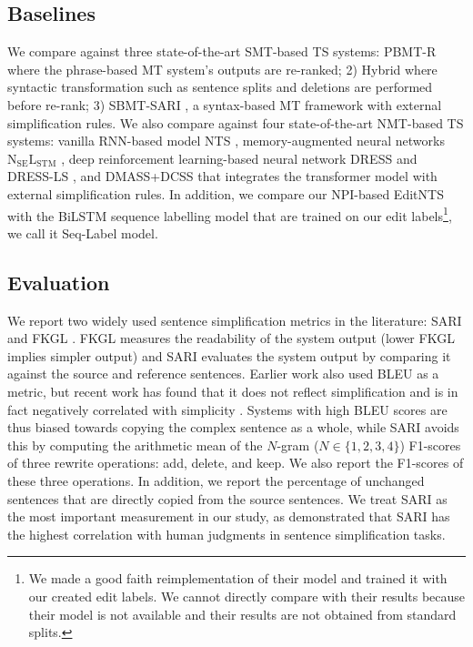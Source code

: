 \documentclass[11pt,a4paper]{article}
\def\seqlabels{Seq-Label }
\def\editnet{EditNTS}
\begin{document}
\subsection{Baselines}
We compare against three state-of-the-art SMT-based TS systems: PBMT-R \citep{wubben2012sentence} where the phrase-based MT system's outputs are re-ranked; 2) Hybrid \citep{narayan2014hybrid} where syntactic transformation such as sentence splits and deletions are performed before re-rank; 3) SBMT-SARI \citep{xu2016optimizing}, a syntax-based MT framework with external simplification rules. We also compare against four state-of-the-art NMT-based TS systems: vanilla RNN-based model NTS \cite{nisioi2017exploring}, memory-augmented neural networks $\text{N}_{\text{SE}}\text{L}_{\text{STM}}$ \cite{vu2018sentence}, deep reinforcement learning-based neural network DRESS and  DRESS-LS \citep{zhang2017sentence}, and DMASS+DCSS \citep{zhao2018integrating} that integrates the transformer model with external simplification rules. In addition, we compare our NPI-based \editnet{} with the BiLSTM sequence labelling model \citep{alva2017learning} that are trained on our edit labels\footnote{We made a good faith reimplementation of their model and trained it with our created edit labels. We cannot directly compare with their results because their model is not available and their results are not obtained from standard splits.}, we call it \seqlabels model. 
\subsection{Evaluation}
\label{sec:eval}
We report two widely used sentence simplification metrics in the literature: SARI \citep{xu2016optimizing} and FKGL \cite{kincaid1975derivation}. FKGL \citep{kincaid1975derivation} measures the readability of the system output (lower FKGL
implies simpler output) and SARI \citep{xu2016optimizing} evaluates the system output by comparing it against the source and reference sentences. Earlier work also used BLEU as a metric, but recent work has found that it does not reflect simplification \citep{xu2016optimizing} and is in fact negatively correlated with simplicity \citep{sulem2018bleu}. Systems with high BLEU scores are thus biased towards copying the complex sentence as a whole, while SARI avoids this by computing  the  arithmetic  mean  of the $N$-gram ($N \in \{1,2,3,4\}$) F1-scores of three rewrite operations: add, delete, and keep. We also report the F1-scores of these three operations. In addition, we report the percentage of unchanged sentences that are directly copied from the source sentences. We treat SARI as the most important measurement in our study, as \citet{xu2016optimizing} demonstrated that SARI has the highest correlation with human judgments in sentence simplification tasks. 
\end{document}
